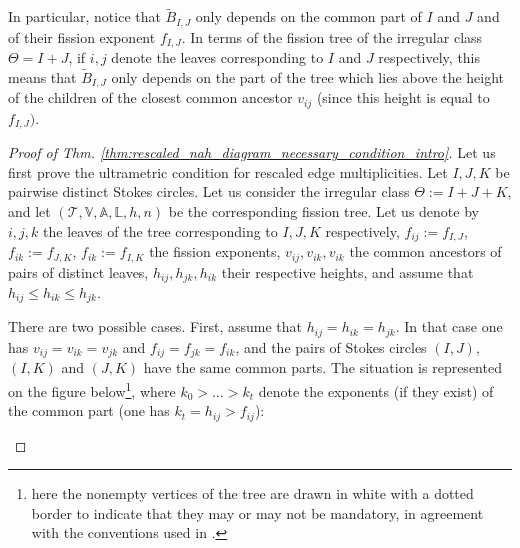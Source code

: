 \documentclass[11pt,a4paper]{amsart}
\numberwithin{equation}{section}
\begin{document}
\begin{remark}
In particular, notice that $\widetilde B_{I,J}$ only depends on the common part of $I$ and $J$ and of their fission exponent $f_{I,J}$. In terms of the fission tree of the irregular class $\Theta=I+J$, if $i,j$ denote the leaves corresponding to $I$ and $J$ respectively, this means that $\widetilde B_{I,J}$ only depends on the part of the tree which lies above the height of the children of the closest common ancestor $v_{ij}$ (since this height is equal to $f_{I,J})$. 
\end{remark}



\begin{proof}[Proof of Thm. \ref{thm:rescaled_nah_diagram_necessary_condition_intro}]
Let us first prove the ultrametric condition for rescaled edge multiplicities. Let $I,J,K$ be pairwise distinct Stokes circles. Let us consider the irregular class $\Theta:=I+J+K$, and let $(\mathcal T, \mathbb V, \mathbb A, \mathbb L, h, n)$ be the corresponding fission tree. Let us denote by $i,j,k$ the leaves of the tree corresponding to $I,J,K$ respectively, $f_{ij}:=f_{I,J}$, $f_{ik}:=f_{J,K}$, $f_{ik}:=f_{I,K}$ the fission exponents, $v_{ij}, v_{ik}, v_{ik}$ the common ancestors of pairs of distinct leaves, $h_{ij}, h_{jk}, h_{ik}$ their respective heights, and assume that $h_{ij}\leq h_{ik}\leq h_{jk}$. 

There are two possible cases. First, assume that $h_{ij}=h_{ik}= h_{jk}$. In that case one has $v_{ij}=v_{ik}=v_{jk}$ and $f_{ij}=f_{jk}=f_{ik}$, and the pairs of Stokes circles $(I,J)$, $(I,K)$ and $(J,K)$ have the same common parts.  The situation is represented on the figure below\footnote{here the nonempty vertices of the tree are drawn in white with a dotted border to indicate that they may or may not be mandatory, in agreement with the conventions used in \cite{boalch2025twisted}.}, where $k_0>\dots>k_t$ denote the exponents (if they exist) of the common part (one has $k_t=h_{ij}>f_{ij}$):
\begin{center}
\end{center}
\end{proof}
\end{document}

